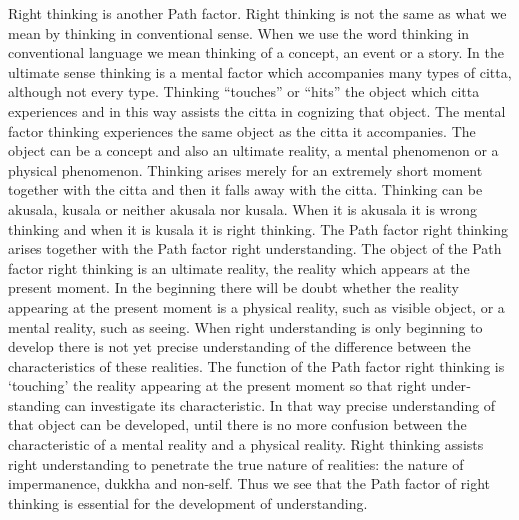 \documentclass{book}
\begin{document}
Right thinking is another Path factor. Right thinking is not the same as
what we mean by thinking in conventional sense. When we use the word
thinking in conventional language we mean thinking of a concept, an
event or a story. In the ultimate sense thinking is a mental factor
which accompanies many types of citta, although not every type. Thinking
``touches'' or ``hits'' the object which citta experiences and in this
way assists the citta in cognizing that object. The mental factor
thinking expe­riences the same object as the citta it accompanies. The
object can be a concept and also an ultimate reality, a mental
phenomenon or a physical phenomenon. Thinking arises merely for an
extremely short moment together with the citta and then it falls away
with the citta. Thinking can be akusala, kusala or neither akusala nor
kusala. When it is akusala it is wrong thinking and when it is kusala it
is right thinking. The Path factor right thinking arises together with
the Path factor right understanding. The object of the Path factor right
thinking is an ultimate reality, the reality which appears at the
present moment. In the beginning there will be doubt whether the reality
appearing at the present moment is a physical reality, such as visible
object, or a mental reality, such as seeing. When right understanding is
only beginning to develop there is not yet precise understanding of the
difference between the characteristics of these realities. The function
of the Path factor right thinking is `touching' the reality appearing
at the present moment so that right under­standing can investigate its
characteristic. In that way precise understanding of that object can be
developed, until there is no more confusion between the characteristic
of a mental reality and a physical reality. Right thinking assists right
understanding to penetrate the true nature of realities: the nature of
impermanence, dukkha and non-self. Thus we see that the Path factor of
right thinking is essential for the development of understanding.
\end{document}
